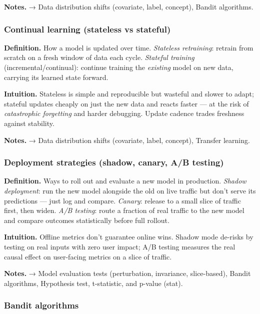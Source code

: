 \documentclass[
  10pt,
  letterpaper,
  onecolumn]{article}
\begin{document}
\textbf{Notes.} → Data distribution shifts (covariate, label, concept),
Bandit algorithms.

\hypertarget{continual-learning-stateless-vs-stateful}{%
\subsubsection{Continual learning (stateless vs
stateful)}\label{continual-learning-stateless-vs-stateful}}

\textbf{Definition.} How a model is updated over time. \emph{Stateless
retraining}: retrain from scratch on a fresh window of data each cycle.
\emph{Stateful training} (incremental/continual): continue training the
\emph{existing} model on new data, carrying its learned state forward.

\textbf{Intuition.} Stateless is simple and reproducible but wasteful
and slower to adapt; stateful updates cheaply on just the new data and
reacts faster --- at the risk of \emph{catastrophic forgetting} and
harder debugging. Update cadence trades freshness against stability.

\textbf{Notes.} → Data distribution shifts (covariate, label, concept),
Transfer learning.

\hypertarget{deployment-strategies-shadow-canary-ab-testing}{%
\subsubsection{Deployment strategies (shadow, canary, A/B
testing)}\label{deployment-strategies-shadow-canary-ab-testing}}

\textbf{Definition.} Ways to roll out and evaluate a new model in
production. \emph{Shadow deployment}: run the new model alongside the
old on live traffic but don't serve its predictions --- just log and
compare. \emph{Canary}: release to a small slice of traffic first, then
widen. \emph{A/B testing}: route a fraction of real traffic to the new
model and compare outcomes statistically before full rollout.

\textbf{Intuition.} Offline metrics don't guarantee online wins. Shadow
mode de-risks by testing on real inputs with zero user impact; A/B
testing measures the real causal effect on user-facing metrics on a
slice of traffic.

\textbf{Notes.} → Model evaluation tests (perturbation, invariance,
slice-based), Bandit algorithms, Hypothesis test, t-statistic, and
p-value (stat).

\hypertarget{bandit-algorithms}{%
\subsubsection{Bandit algorithms}\label{bandit-algorithms}}
\end{document}
